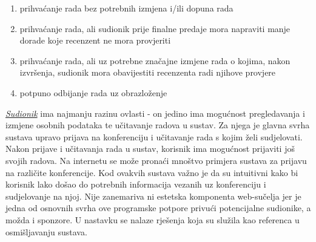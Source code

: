 		\begin{enumerate}
			
			\item prihvaćanje rada bez potrebnih izmjena i/ili dopuna rada
			\item prihvaćanje rada, ali sudionik prije finalne predaje mora napraviti manje dorade koje recenzent ne mora provjeriti
			\item prihvaćanje rada, ali uz potrebne značajne izmjene rada o kojima, nakon izvršenja, sudionik mora obavijestiti recenzenta radi njihove provjere
			\item potpuno odbijanje rada uz obrazloženje
			
		\end{enumerate}
		\indent \underline{\textit{Sudionik}} ima najmanju razinu ovlasti - on jedino ima mogućnost pregledavanja i izmjene osobnih podataka te učitavanje radova u sustav. Za njega je glavna svrha sustava upravo prijava na konferenciju i učitavanje rada s kojim želi sudjelovati. Nakon prijave i učitavanja rada u sustav, korisnik ima mogućnost prijaviti još svojih radova.
		\newline
		\newline
		\indent Na internetu se može pronaći mnoštvo primjera sustava za prijavu na različite konferencije. Kod ovakvih sustava važno je da su intuitivni kako bi korisnik lako došao do potrebnih informacija vezanih uz konferenciju i sudjelovanje na njoj. Nije zanemariva ni estetska komponenta web-sučelja jer je jedna od osnovnih svrha ove programske potpore privući potencijalne sudionike, a možda i sponzore. U nastavku se nalaze rješenja koja su služila kao referenca u osmišljavanju sustava.
		\newline
		\newline
		
